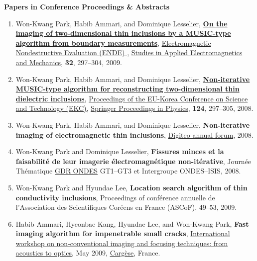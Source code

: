 \documentclass[10pt,A4]{article}
\newcommand{\cvsection}[1]
{
	\begin{center}
		\large\textcolor{sectcol}{\textbf{#1}}
	\end{center}
}
\begin{document}
\cvsection{Papers in Conference Proceedings \& Abstracts}
\begin{enumerate}\renewcommand{\theenumi}{[C\arabic{enumi}]}
\renewcommand{\labelenumi}{\theenumi}
\item\label{C-ENDE2008} Won-Kwang Park, Habib Ammari, and Dominique Lesselier, \href{http://dx.doi.org/10.3233/978-1-60750-023-0-297}{\textbf{On the imaging of two-dimensional thin inclusions by a MUSIC-type algorithm from boundary measurements}}, \href{http://ebooks.iospress.nl/volume/electromagnetic-nondestructive-evaluation-xii}{Electromagnetic Nondestructive Evaluation (ENDE) }, \href{http://ebooks.iospress.nl/bookseries/studies-in-applied-electromagnetics-and-mechanics}{Studies in Applied Electromagnetics and Mechanics}, \textbf{32}, 297--304, 2009.
\item\label{C-EKC2008} Won-Kwang Park, Habib Ammari, and Dominique Lesselier, \href{http://dx.doi.org/10.1007/978-3-540-85190-5_31}{\textbf{Non-iterative MUSIC-type algorithm for reconstructing two-dimensional thin dielectric inclusions}}, \href{http://www.springer.com/engineering/mechanical+eng/book/978-3-540-85189-9}{Proceedings of the EU-Korea Conference on Science and Technology (EKC)}, \href{http://www.springer.com/series/361}{Springer Proceedings in Physics}, \textbf{124}, 297--305, 2008.
\item\label{C-DIGITEO2008} Won-Kwang Park, Habib Ammari, and Dominique Lesselier, \textbf{Non-iterative imaging of electromagnetic thin inclusions}, \href{http://www.digiteo.fr/Digiteo_Annual_Forum_2008/}{Digiteo annual forum}, 2008.
\item\label{C-GDR2008} Won-Kwang Park and Dominique Lesselier, \textbf{Fissures minces et la faisabilit\'e de leur imagerie \'electromagn\'etique non-it\'erative}, Journ\'ee Th\'ematique \href{http://gdr-ondes.lss.supelec.fr/actu/index.htm}{GDR ONDES} GT1--GT3 et Intergroupe ONDES--ISIS, 2008.
\item\label{C-ASCOF2009} Won-Kwang Park and Hyundae Lee, \textbf{Location search algorithm of thin conductivity inclusions}, Proceedings of conf\'erence annuelle de l'Association des Scientifiques Cor\'eens en France (ASCoF), 49--53, 2009.
\item\label{C-CARGESE2009} Habib Ammari, Hyeonbae Kang, Hyundae Lee, and Won-Kwang Park, \textbf{Fast imaging algorithm for impenetrable small cracks}, \href{http://www.loa.espci.fr/cargese2009/home.html}{International workshop on non-conventional imaging and focusing techniques: from acoustics to optics}, May 2009, \href{https://www.cargese.corsica}{Carg\`ese}, France.

\end{enumerate}
\end{document}
